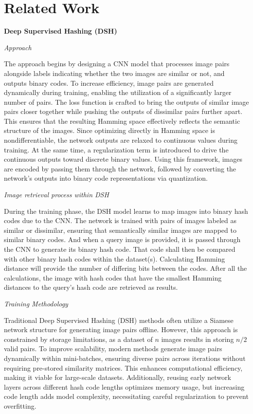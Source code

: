 \section{Related Work}

\textbf{Deep Supervised Hashing (DSH)}

\textit{Approach}

The approach begins by designing a CNN model that processes image pairs alongside labels indicating whether the two images are similar or not, and outputs binary codes. To increase efficiency, image pairs are generated dynamically during training, enabling the utilization of a significantly larger number of pairs. The loss function is crafted to bring the outputs of similar image pairs closer together while pushing the outputs of dissimilar pairs further apart. This ensures that the resulting Hamming space effectively reflects the semantic structure of the images. Since optimizing directly in Hamming space is nondifferentiable, the network outputs are relaxed to continuous values during training. At the same time, a regularization term is introduced to drive the continuous outputs toward discrete binary values. Using this framework, images are encoded by passing them through the network, followed by converting the network's outputs into binary code representations via quantization.

\textit{Image retrieval process within DSH}

During the training phase, the DSH model learns to map images into binary hash codes due to the CNN. The network is trained with pairs of images labeled as similar or dissimilar, ensuring that semantically similar images are mapped to similar binary codes. And when a query image is provided, it is passed through the CNN to generate its binary hash code. That code shall then be compared with other binary hash codes within the dataset(s). Calculating Hamming distance will provide the number of differing bits between the codes. After all the calculations, the image with hash codes that have the smallest Hamming distances to the query's hash code are retrieved as results.

\textit{Training Methodology}

Traditional Deep Supervised Hashing (DSH) methods often utilize a Siamese network structure for generating image pairs offline. However, this approach is constrained by storage limitations, as a dataset of $n$ images results in storing $n/2$ valid pairs. To improve scalability, modern methods generate image pairs dynamically within mini-batches, ensuring diverse pairs across iterations without requiring pre-stored similarity matrices. This enhances computational efficiency, making it viable for large-scale datasets. Additionally, reusing early network layers across different hash code lengths optimizes memory usage, but increasing code length adds model complexity, necessitating careful regularization to prevent overfitting.\cite{Liu_2016_CVPR}

